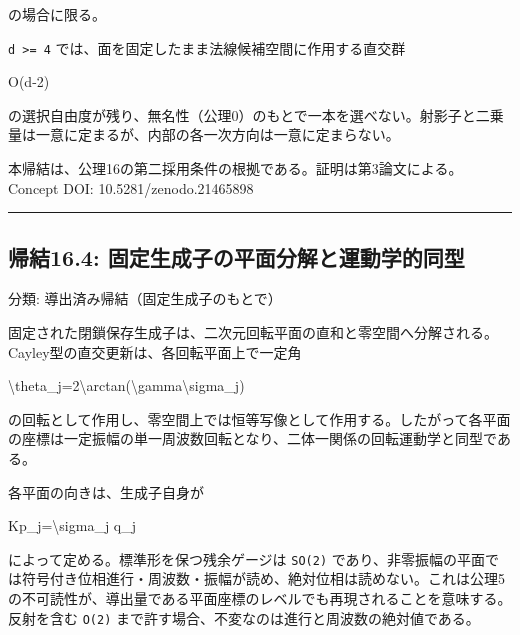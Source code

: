 \documentclass[
  a4paper,
]{ltjsarticle}
\newenvironment{Shaded}{}{}
\newcommand{\NormalTok}[1]{#1}
\begin{document}
の場合に限る。

\texttt{d\ \textgreater{}=\ 4}
では、面を固定したまま法線候補空間に作用する直交群

\begin{Shaded}
\begin{Highlighting}[]
\NormalTok{O(d{-}2)}
\end{Highlighting}
\end{Shaded}

の選択自由度が残り、無名性（公理0）のもとで一本を選べない。射影子と二乗量は一意に定まるが、内部の各一次方向は一意に定まらない。

本帰結は、公理16の第二採用条件の根拠である。証明は第3論文による。Concept
DOI: 10.5281/zenodo.21465898

\begin{center}\rule{0.5\linewidth}{0.5pt}\end{center}

\subsection{帰結16.4:
固定生成子の平面分解と運動学的同型}\label{ux5e30ux7d5016.4-ux56faux5b9aux751fux6210ux5b50ux306eux5e73ux9762ux5206ux89e3ux3068ux904bux52d5ux5b66ux7684ux540cux578b}

分類: 導出済み帰結（固定生成子のもとで）

固定された閉鎖保存生成子は、二次元回転平面の直和と零空間へ分解される。Cayley型の直交更新は、各回転平面上で一定角

\begin{Shaded}
\begin{Highlighting}[]
\NormalTok{\textbackslash{}theta\_j=2\textbackslash{}arctan(\textbackslash{}gamma\textbackslash{}sigma\_j)}
\end{Highlighting}
\end{Shaded}

の回転として作用し、零空間上では恒等写像として作用する。したがって各平面の座標は一定振幅の単一周波数回転となり、二体一関係の回転運動学と同型である。

各平面の向きは、生成子自身が

\begin{Shaded}
\begin{Highlighting}[]
\NormalTok{Kp\_j=\textbackslash{}sigma\_j q\_j}
\end{Highlighting}
\end{Shaded}

によって定める。標準形を保つ残余ゲージは \texttt{SO(2)}
であり、非零振幅の平面では符号付き位相進行・周波数・振幅が読め、絶対位相は読めない。これは公理5の不可読性が、導出量である平面座標のレベルでも再現されることを意味する。反射を含む
\texttt{O(2)} まで許す場合、不変なのは進行と周波数の絶対値である。
\end{document}
